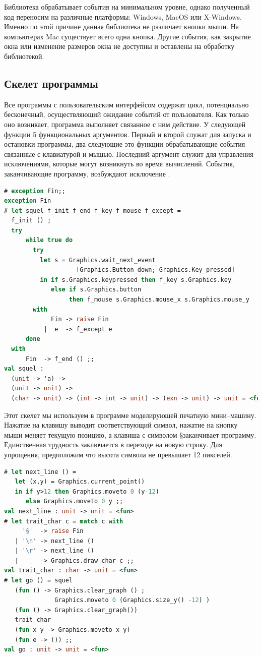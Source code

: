 Библиотека  обрабатывает события на минимальном уровне, однако 
полученный код переносим на различные платформы: Windows, MacOS или X-Windows. 
Именно по этой причине данная библиотека не различает кнопки мыши. На 
компьютерах Mac существует всего одна кнопка. Другие события, как закрытие окна 
или изменение размеров окна не доступны и оставлены на обработку библиотекой.

\subsection{Скелет программы}
\label{subsec:program_skeleton}

Все программы с пользовательским интерфейсом содержат цикл, потенциально 
бесконечный, осуществляющий ожидание событий от пользователя. Как только оно 
возникает, программа выполняет связанное с ним действие. У следующей функции 5 
функциональных аргументов. Первый и второй служат для запуска и остановки 
программы, два следующие это функции обрабатывающие события связанные с 
клавиатурой и мышью. Последний аргумент служит для управления исключениями, 
которые могут возникнуть во время вычислений. События, заканчивающие программу, 
возбуждают исключение .

\begin{lstlisting}[language=OCaml]
# exception Fin;;
exception Fin
# let squel f_init f_end f_key f_mouse f_except = 
  f_init () ;
  try 
      while true do 
        try 
          let s = Graphics.wait_next_event 
                    [Graphics.Button_down; Graphics.Key_pressed] 
          in if s.Graphics.keypressed then f_key s.Graphics.key
             else if s.Graphics.button 
                  then f_mouse s.Graphics.mouse_x s.Graphics.mouse_y
        with 
             Fin -> raise Fin
           |  e  -> f_except e
      done
  with 
      Fin  -> f_end () ;;
val squel :
  (unit -> 'a) ->
  (unit -> unit) ->
  (char -> unit) -> (int -> int -> unit) -> (exn -> unit) -> unit = <fun>
\end{lstlisting}

Этот скелет мы используем в программе моделирующей печатную мини--машину. 
Нажатие на клавишу выводит соответствующий символ, нажатие на кнопку мыши меняет 
текущую позицию, а клавиша с символом \S заканчивает программу. Единственная 
трудность заключается в переходе на новую строку. Для упрощения, предположим что 
высота символа не превышает 12 пикселей.

\begin{lstlisting}[language=OCaml]
# let next_line () = 
   let (x,y) = Graphics.current_point() 
   in if y>12 then Graphics.moveto 0 (y-12)
      else Graphics.moveto 0 y ;;
val next_line : unit -> unit = <fun>
# let trait_char c = match c with 
     '§'  -> raise Fin
   | '\n' -> next_line ()
   | '\r' -> next_line ()
   |   _  -> Graphics.draw_char c ;;
val trait_char : char -> unit = <fun>
# let go () = squel 
   (fun () -> Graphics.clear_graph () ; 
              Graphics.moveto 0 (Graphics.size_y() -12) )
   (fun () -> Graphics.clear_graph())
   trait_char
   (fun x y -> Graphics.moveto x y)
   (fun e -> ()) ;;
val go : unit -> unit = <fun>
\end{lstlisting}

